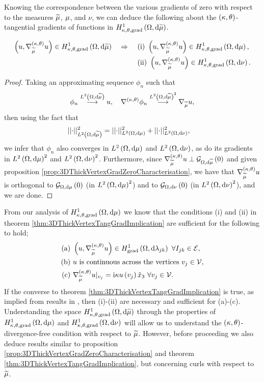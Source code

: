 Knowing the correspondence between the various gradients of zero with respect to the measures $\widetilde{\mu}$, $\mu$, and $\nu$, we can deduce the following about the $\left( \kappa, \theta \right)$-tangential gradients of functions in $H^1_{\kappa,\theta,\mathrm{grad}}\left( \Omega, \mathrm{d}\widetilde{\mu} \right)$.
\begin{theorem} \label{thm:3DThickVertexTangGradImplication}
	\begin{align*}
		\left( u, \nabla^{\left( \kappa, \theta \right)}_{\widetilde{\mu}}u \right)\in H^1_{\kappa,\theta,\mathrm{grad}}\left( \Omega, \mathrm{d}\widetilde{\mu} \right) \quad\Rightarrow\quad
		& \ \mathrm{(i)} \ \left( u, \nabla^{\left( \kappa, \theta \right)}_{\widetilde{\mu}}u \right)\in H^1_{\kappa,\theta,\mathrm{grad}}\left( \Omega, \mathrm{d}\mu \right), \\
		& \ \mathrm{(ii)} \ \left( u, \nabla^{\left( \kappa, \theta \right)}_{\widetilde{\mu}}u \right)\in H^1_{\kappa,\theta,\mathrm{grad}}\left( \Omega, \mathrm{d}\nu \right). \\
	\end{align*}
\end{theorem}
\begin{proof}
	Taking an approximating sequence $\phi_n$ such that
	\begin{align*}
		\phi_n \overset{L^{2}\left( \Omega,\mathrm{d}\widetilde{\mu} \right)}{\longrightarrow} u, \quad \nabla^{\left( \kappa, \theta \right)}\phi_n\overset{L^{2}\left( \Omega,\mathrm{d}\widetilde{\mu} \right)^2}{\longrightarrow}\nabla_{\widetilde{\mu}}u,
	\end{align*}
	then using the fact that
	\begin{align*}
		\lvert\lvert \cdot \rvert\rvert_{L^{2}\left( \Omega,\mathrm{d}\widetilde{\mu} \right)}^2 &= \lvert\lvert \cdot \rvert\rvert_{L^{2}\left( \Omega,\mathrm{d}\mu \right)}^2 + \lvert\lvert \cdot \rvert\rvert_{L^{2}\left( \Omega,\mathrm{d}\nu \right)}^2,
	\end{align*}
	we infer that $\phi_n$ also converges in $L^{2}\left( \Omega,\mathrm{d}\mu \right)$ and $L^{2}\left( \Omega,\mathrm{d}\nu \right)$, as do its gradients in $L^{2}\left( \Omega,\mathrm{d}\mu \right)^2$ and $L^{2}\left( \Omega,\mathrm{d}\nu \right)^2$.
	Furthermore, since $\nabla^{\left( \kappa, \theta \right)}_{\widetilde{\mu}}u \perp \mathcal{G}_{ \Omega, \mathrm{d}\widetilde{\mu}}\left( 0 \right)$ and given proposition \ref{prop:3DThickVertexGradZeroCharacterisation}, we have that $\nabla^{\left( \kappa, \theta \right)}_{\widetilde{\mu}}u$ is orthogonal to $\mathcal{G}_{ \Omega, \mathrm{d}\mu}\left( 0 \right)$ (in $L^{2}\left( \Omega,\mathrm{d}\mu \right)^2$) and to $\mathcal{G}_{ \Omega, \mathrm{d}\nu}\left( 0 \right)$ (in $L^{2}\left( \Omega,\mathrm{d}\nu \right)^2$), and we are done. 
\end{proof}
From our analysis of $H^1_{\kappa,\theta,\mathrm{grad}}\left( \Omega, \mathrm{d}\mu \right)$ we know that the conditions (i) and (ii) in theorem \ref{thm:3DThickVertexTangGradImplication} are sufficient for the following to hold;
\begin{align*}
		\text{(a)} \ & \bracs{u, \ktgrad_{\dddmes}u}\in\gradSob{\ddom}{\lambda_{jk}} \ \forall I_{jk}\in\edgeSet, \\
		\text{(b)} \ & u \text{ is continuous across the vertices} \ v_j\in\vertSet, \\
		\text{(c)} \ & \ktgrad_{\dddmes}u\vert_{v_j} = \rmi\wavenumber u\bracs{v_j}\hat{x}_3 \ \forall v_j\in\vertSet.
\end{align*}
If the converse to theorem \ref{thm:3DThickVertexTangGradImplication} is true, as implied from results in \cite{zhikov2002homogenization}, then (i)-(ii) are necessary and sufficient for (a)-(c).
Understanding the space $H^1_{\kappa,\theta,\mathrm{grad}}\left( \Omega, \mathrm{d}\widetilde{\mu} \right)$ through the properties of $H^1_{\kappa,\theta,\mathrm{grad}}\left( \Omega, \mathrm{d}\mu \right)$ and $H^1_{\kappa,\theta,\mathrm{grad}}\left( \Omega, \mathrm{d}\nu \right)$ will allow us to understand the $\left( \kappa, \theta \right)$-divergence-free condition with respect to $\widetilde{\mu}$.
However, before proceeding we also deduce results similar to proposition \ref{prop:3DThickVertexGradZeroCharacterisation} and theorem \ref{thm:3DThickVertexTangGradImplication}, but concerning curls with respect to $\widetilde{\mu}$.

